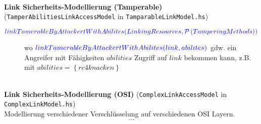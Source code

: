 \documentclass[varwidth=18cm]{standalone}
\begin{document}
 \\
\textbf{Link Sicherheits-Modellierung (Tamperable) } (\texttt{TamperAbilitiesLinkAccessModel} in \texttt{TamparableLinkModel.hs})\\



\begin{description}
  \item[${\color{blue}{linkTamerableByAttackertWithAbilites(LinkingResources,\mathcal{P}\left(TamperingMethods\right))}}$] wo ${\color{blue}{linkTamerableByAttackertWithAbilites(link, abilites)}}$ gdw.
       ein Angreifer mit Fähigkeiten $abilities$ Zugriff auf $link$ bekommen kann,
       z.B. mit $abilities=\left\{rc4knacken\right\}$ 
\end{description}

 \\
\textbf{Link Sicherheits-Modellierung (OSI) } (\texttt{ComplexLinkAccessModel} in \texttt{ComplexLinkModel.hs})\\

Modellierung verschiedener  Verschlüsselung auf verschiedenen OSI Layern.
\[ \ldots \]
\end{document}

